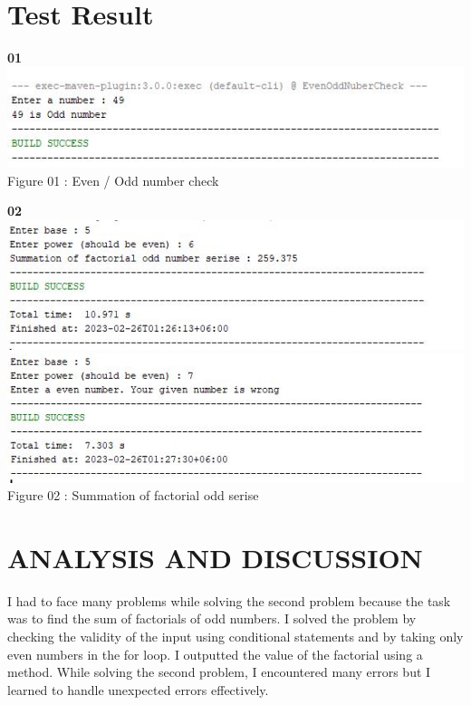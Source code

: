 \documentclass{article}
\begin{document}
\section{Test Result}
\large \textbf{01}
 \includegraphics[width=1\textwidth]{problem1.JPG}
 \centering
\large Figure 01 : Even / Odd number check
\vspace{0.5cm}

\large \textbf{02}
\includegraphics[width=1\textwidth]{problem2.JPG}
 \centering
 \includegraphics[width=1\textwidth]{problem3.JPG}
 \centering
\large Figure 02 : Summation of factorial odd serise

 
\section{ANALYSIS AND DISCUSSION}
 I had to face many problems while solving the second problem because the task was to find the sum of factorials of odd numbers. I solved the problem by checking the validity of the input using conditional statements and by taking only even numbers in the for loop. I outputted the value of the factorial using a method. While solving the second problem, I encountered many errors but I learned to handle unexpected errors effectively.

  

 
\end{document}
